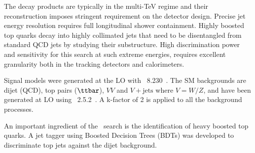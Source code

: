 The decay products are typically in the multi-TeV regime and their reconstruction imposes stringent requirement on the detector design. Precise jet energy resolution requires full longitudinal shower containment. Highly boosted top quarks decay into highly collimated jets that need to  be disentangled from standard QCD jets by studying their substructure. High discrimination power and sensitivity for this search at such extreme energies, requires excellent granularity both in the tracking detectors and calorimeters.

Signal models were generated at the LO with \PYTHIA~8.230~\cite{Sjostrand:2014zea}. The SM backgrounds are dijet (QCD), top pairs ($\ttbar$), $VV$ and $V+\text{jets}$ where $V=W/Z$, and have been generated at LO using \MGvATNLO ~2.5.2~\cite{Alwall:2014hca}. A k-factor of 2 is applied to all the background processes. 


\label{sec:mvatagger}
An important ingredient of the \zptt\ search is the identification of heavy boosted top quarks. A jet tagger using Boosted Decision Trees (BDTs) was developed to discriminate top jets against the dijet background.

